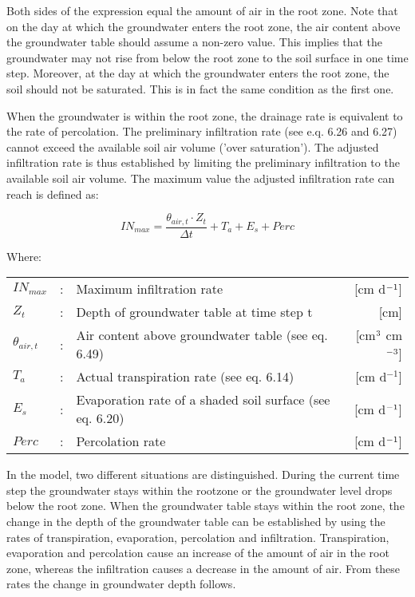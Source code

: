 Both sides of the expression equal the amount of air in the root zone. Note that on the
day at which the groundwater enters the root zone, the air content above the groundwater
table should assume a non-zero value. This implies that the groundwater may not rise
from below the root zone to the soil surface in one time step. Moreover, at the day at
which the groundwater enters the root zone, the soil should not be saturated. This is in
fact the same condition as the first one. 

When the groundwater is within the root zone, the drainage rate is equivalent to the rate
of percolation. The preliminary infiltration rate (see e.q. 6.26 and 6.27) cannot exceed
the available soil air volume ('over saturation'). The adjusted infiltration rate is thus
established by limiting the preliminary infiltration to the available soil air volume. The
maximum value the adjusted infiltration rate can reach is defined as:

\begin{equation}
IN_{max} = {\frac{\theta_{air,t} \cdot Z _{t}}{\Delta t}} + T_{a} + E_{s} + Perc
\end{equation}

Where:\\[5pt]
\begin{tabularx}{\textwidth}{llXr}
$IN_{max}$ &:& Maximum infiltration rate  & [cm d$^{{\rm -1}}$]\\
$Z_{t}$ &:& Depth of groundwater table at time step t  & [cm]\\
$\theta_{air,t}$ &:& Air content above groundwater table (see eq. 6.49)  & [cm$^{{\rm 3}}$ cm$^{{\rm -3}}$]\\
$T_{a}$ &:& Actual transpiration rate (see eq. 6.14)  & [cm d$^{-1}$]\\
$E_{s}$ &:& Evaporation rate of a shaded soil surface (see eq. 6.20)  & [cm d$^{{\rm -1}}$]\\
$Perc$ &:& Percolation rate  & [cm d$^{{\rm -1}}$]\\
\end{tabularx}

In the model, two different situations are distinguished. During the current time step the
groundwater stays within the rootzone or the groundwater level drops below the root
zone. When the groundwater table stays within the root zone, the change in the depth of
the groundwater table can be established by using the rates of transpiration, evaporation,
percolation and infiltration. Transpiration, evaporation and percolation cause an increase
of the amount of air in the root zone, whereas the infiltration causes a decrease in the
amount of air. From these rates the change in groundwater depth follows. 

